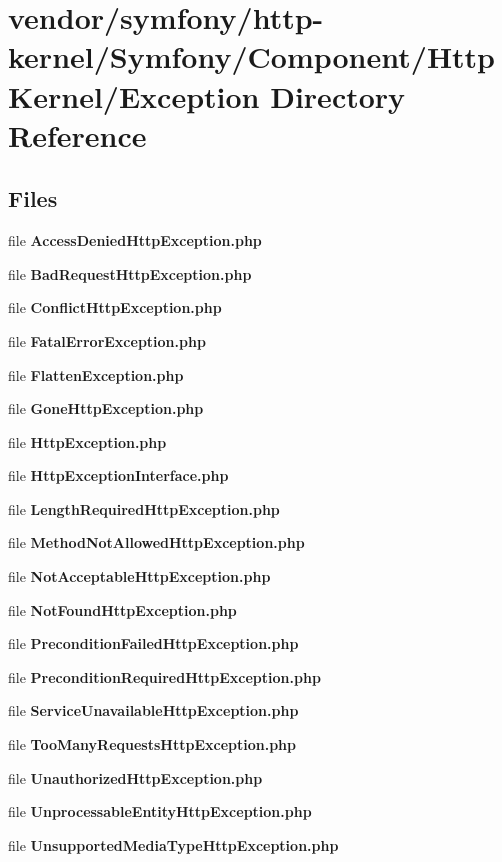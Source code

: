 \section{vendor/symfony/http-\/kernel/\+Symfony/\+Component/\+Http\+Kernel/\+Exception Directory Reference}
\label{dir_ccab4707bff0ff309b34179b30b5a569}
\subsection*{Files}
\begin{DoxyCompactItemize}
\item 
file {\bf Access\+Denied\+Http\+Exception.\+php}
\item 
file {\bf Bad\+Request\+Http\+Exception.\+php}
\item 
file {\bf Conflict\+Http\+Exception.\+php}
\item 
file {\bf Fatal\+Error\+Exception.\+php}
\item 
file {\bf Flatten\+Exception.\+php}
\item 
file {\bf Gone\+Http\+Exception.\+php}
\item 
file {\bf Http\+Exception.\+php}
\item 
file {\bf Http\+Exception\+Interface.\+php}
\item 
file {\bf Length\+Required\+Http\+Exception.\+php}
\item 
file {\bf Method\+Not\+Allowed\+Http\+Exception.\+php}
\item 
file {\bf Not\+Acceptable\+Http\+Exception.\+php}
\item 
file {\bf Not\+Found\+Http\+Exception.\+php}
\item 
file {\bf Precondition\+Failed\+Http\+Exception.\+php}
\item 
file {\bf Precondition\+Required\+Http\+Exception.\+php}
\item 
file {\bf Service\+Unavailable\+Http\+Exception.\+php}
\item 
file {\bf Too\+Many\+Requests\+Http\+Exception.\+php}
\item 
file {\bf Unauthorized\+Http\+Exception.\+php}
\item 
file {\bf Unprocessable\+Entity\+Http\+Exception.\+php}
\item 
file {\bf Unsupported\+Media\+Type\+Http\+Exception.\+php}
\end{DoxyCompactItemize}
